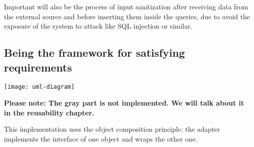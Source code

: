 Important will also be the process of input sanitization after receiving data from the external source and before inserting them inside the queries, due to avoid the exposure of the system to attack like SQL injection or similar.

\subsection{Being the framework for satisfying requirements}

\begin{center}
\texttt{[image: uml-diagram]}
\end{center}

\textbf{Please note: The gray part is not implemented. We will talk about it in the reusability chapter.}

This implementation uses the object composition principle: the adapter implements the interface of one object and wraps the other one.

